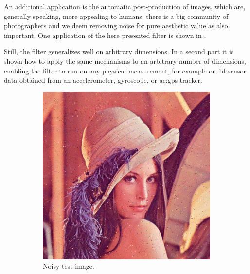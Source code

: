 An additional application is the automatic post-production of images, which are, generally speaking, more appealing to humans; there is a big community of photographers and we deem removing noise for pure aesthetic value as also important.
One application of the here presented filter is shown in .

Still, the filter generalizes well on arbitrary dimensions.
In a second part it is shown how to apply the same mechanisms to an arbitrary number of dimensions, enabling the filter to run on any physical measurement, for example on 1d sensor data obtained from an accelerometer, gyroscope, or \gls{ac:gps} tracker.

\begin{figure}
    \centering
    \begin{subfigure}[]{0.475\textwidth}
        \includegraphics[width=\textwidth]{./figures/sensor/introduction_lena_noisy.jpg}
        \caption{Noisy test image.}
        \label{fig:sensor_introduction_lena_noisy}
    \end{subfigure}\hfill%
    \begin{subfigure}[]{0.475\textwidth}

\end{subfigure}
\end{figure}
